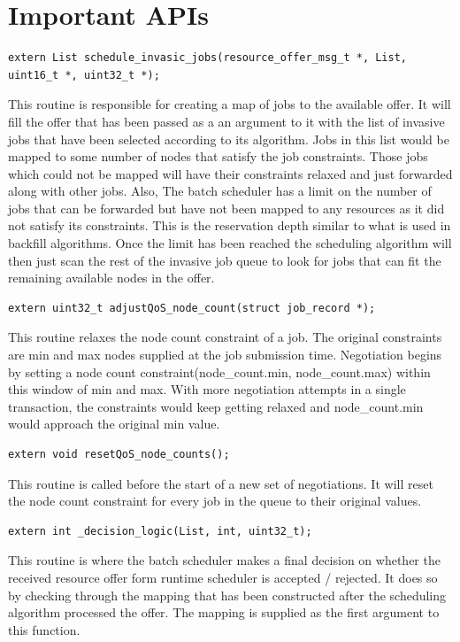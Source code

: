 \section{Important APIs}
\begin{lstlisting}[mathescape,frame=single]
extern List schedule_invasic_jobs(resource_offer_msg_t *, List, uint16_t *, uint32_t *);
\end{lstlisting}
This routine is responsible for creating a map of jobs to the available offer. It will fill the offer that has been passed as a an argument to it with the list of invasive jobs that have been selected according to its algorithm. Jobs in this list would be mapped to some number of nodes that satisfy the job constraints. Those jobs which could not be mapped will have their constraints relaxed and just forwarded along with other jobs. Also, The batch scheduler has a limit on the number of jobs that can be forwarded but have not been mapped to any resources as it did not satisfy its constraints. This is the reservation depth similar to what is used in backfill algorithms. Once the limit has been reached the scheduling algorithm will then just scan the rest of the invasive job queue to look for jobs that can fit the remaining available nodes in the offer.\\ 
\begin{lstlisting}[mathescape,frame=single]
extern uint32_t adjustQoS_node_count(struct job_record *);
\end{lstlisting}
This routine relaxes the node count constraint of a job. The original constraints are min and max nodes supplied at the job submission time. Negotiation begins by setting a node count constraint(node\_count.min, node\_count.max) within this window of min and max. With more negotiation attempts in a single transaction, the constraints would keep getting relaxed and node\_count.min would approach the original min value.\\
\begin{lstlisting}[mathescape,frame=single]
extern void resetQoS_node_counts();
\end{lstlisting}
This routine is called before the start of a new set of negotiations. It will reset the node count constraint for every job in the queue to their original values.\\
\begin{lstlisting}[mathescape,frame=single]
extern int _decision_logic(List, int, uint32_t);
\end{lstlisting}
This routine is where the batch scheduler makes a final decision on whether the received resource offer form runtime scheduler is accepted / rejected. It does so by checking through the mapping that has been constructed after the scheduling algorithm processed the offer. The mapping is supplied as the first argument to this function.\\
